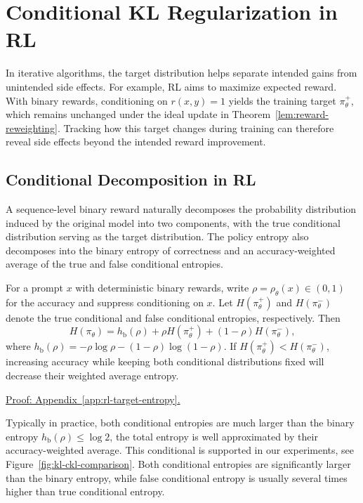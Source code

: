 \section{Conditional KL Regularization in RL}

\begin{insight}
  In iterative algorithms, the target distribution helps separate intended gains from unintended side effects. For example, RL aims to maximize expected reward. With binary rewards, conditioning on $r(x,y)=1$ yields the training target $\pi_\theta^+$, which remains unchanged under the ideal update in Theorem~\ref{lem:reward-reweighting}. Tracking how this target changes during training can therefore reveal side effects beyond the intended reward improvement.
\end{insight}

\subsection{Conditional Decomposition in RL}

A sequence-level binary reward naturally decomposes the probability distribution induced by the original model into two components, with the true conditional distribution serving as the target distribution. The policy entropy also decomposes into the binary entropy of correctness and an accuracy-weighted average of the true and false conditional entropies.

\begin{lemma}
\label{lem:rl-target-entropy}
For a prompt $x$ with deterministic binary rewards, write $\rho=\rho_\theta(x)\in(0,1)$ for the accuracy and suppress conditioning on $x$. Let $H(\pi_\theta^+)$ and $H(\pi_\theta^-)$ denote the true conditional and false conditional entropies, respectively. Then
\begin{equation}
 H(\pi_\theta)=h_{\mathrm b}(\rho)
    +\rho H(\pi_\theta^+)+(1-\rho)H(\pi_\theta^-),
 \label{eq:rl-entropy-decomposition}
\end{equation}
where $h_{\mathrm b}(\rho)=-\rho\log\rho-(1-\rho)\log(1-\rho)$.
If $H(\pi_\theta^+)<H(\pi_\theta^-)$, increasing accuracy while keeping both conditional distributions fixed will decrease their weighted average entropy.
\end{lemma}
\noindent\hyperref[app:rl-target-entropy]{Proof: Appendix~\ref*{app:rl-target-entropy}.}

Typically in practice, both conditional entropies are much larger than the binary entropy $h_{\mathrm b}(\rho)\le\log 2$, the total entropy is well approximated by their accuracy-weighted average. This conditional is supported in our experiments, see Figure~\ref{fig:kl-ckl-comparison}. Both conditional entropies are significantly larger than the binary entropy, while false conditional entropy is usually several times higher than true conditional entropy.

